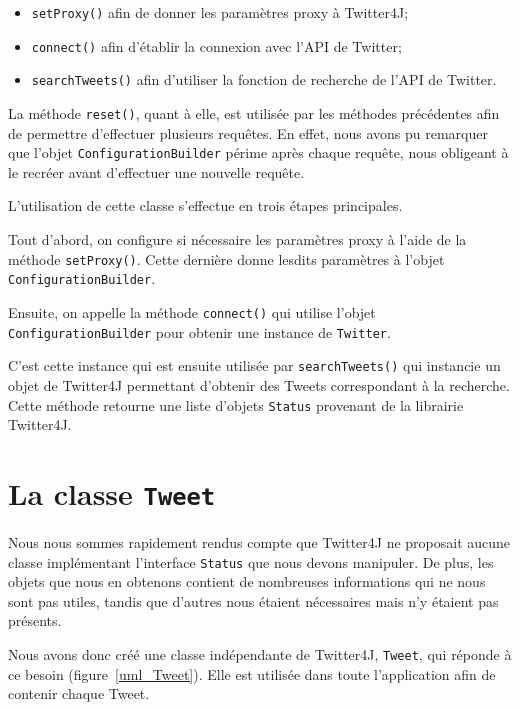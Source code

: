 \documentclass[12pt,a4paper]{report}
\begin{document}
\begin{itemize}
	\item
		\texttt{setProxy()} afin de donner les paramètres proxy à Twitter4J;
	\item
		\texttt{connect()} afin d'établir la connexion avec l'API de Twitter;
	\item
		\texttt{searchTweets()} afin d'utiliser la fonction de recherche de
		l'API de Twitter.
\end{itemize}

La méthode \texttt{reset()}, quant à elle, est utilisée par les méthodes
précédentes afin de permettre d'effectuer plusieurs requêtes. En effet, nous
avons pu remarquer que l'objet \texttt{ConfigurationBuilder} périme après chaque
requête, nous obligeant à le recréer avant d'effectuer une nouvelle requête.

L'utilisation de cette classe s'effectue en trois étapes principales.

Tout d'abord, on configure si nécessaire les paramètres proxy à l'aide de la
méthode \texttt{setProxy()}. Cette dernière donne lesdits paramètres à l'objet
\texttt{ConfigurationBuilder}.

Ensuite, on appelle la méthode \texttt{connect()} qui utilise l'objet
\texttt{ConfigurationBuilder} pour obtenir une instance de \texttt{Twitter}.

C'est cette instance qui est ensuite utilisée par \texttt{searchTweets()} qui
instancie un objet de Twitter4J permettant d'obtenir des Tweets correspondant
à la recherche. Cette méthode retourne une liste d'objets \texttt{Status}
provenant de la librairie Twitter4J.

\newpage
\section{La classe \texttt{Tweet}}

Nous nous sommes rapidement rendus compte que Twitter4J ne proposait aucune
classe implémentant l'interface \texttt{Status} que nous devons manipuler. De
plus, les objets que nous en obtenons contient de nombreuses informations qui ne
nous sont pas utiles, tandis que d'autres nous étaient nécessaires mais
n'y étaient pas présents.

Nous avons donc créé une classe indépendante de Twitter4J, \texttt{Tweet}, qui
réponde à ce besoin (figure~\ref{uml_Tweet}). Elle est utilisée dans toute l'application afin de contenir
chaque Tweet.
\end{document}
